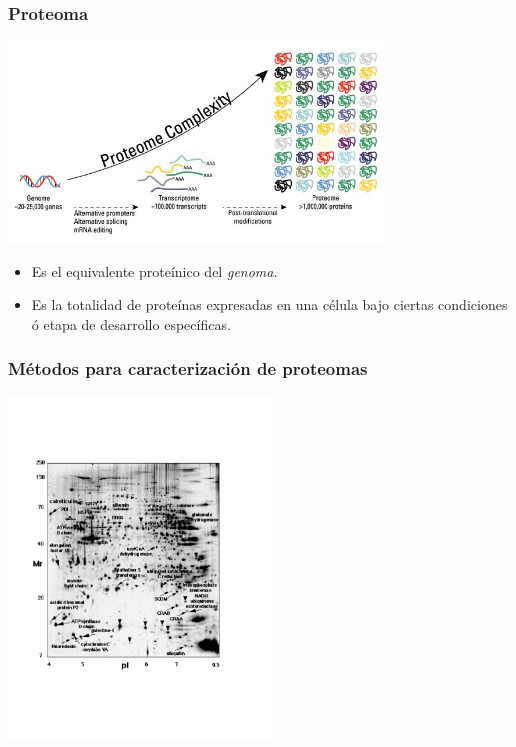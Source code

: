 \documentclass[10pt]{beamer}
\begin{document}
\begin{frame}
\frametitle{Proteoma}
\begin{center}
\includegraphics[width=10cm]{imagenes/Proteome}
\end{center}
\begin{itemize}
\item Es el equivalente proteínico del \emph{genoma}.
\pause
\item Es la totalidad de proteínas expresadas en una célula bajo ciertas condiciones ó etapa de desarrollo específicas.
\end{itemize}
\end{frame}
\begin{frame}
\frametitle{Métodos para caracterización de proteomas}
\begin{center}
\includegraphics[width=7cm]{imagenes/2DPAGE}
\end{center}
\end{frame}
\end{document}
